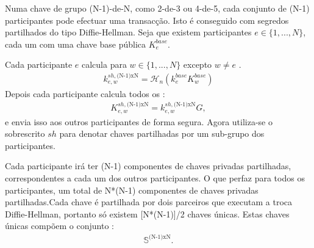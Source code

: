 Numa chave de grupo (N-1)-de-N, como 2-de-3 ou 4-de-5, cada conjunto de (N-1) participantes pode efectuar uma transacção. Isto é conseguido com segredos partilhados do tipo Diffie-Hellman. Seja que existem participantes $e \in \{1,...,N\}$, cada um com uma chave base pública $K^{base}_e$. 


Cada participante $e$ calcula para $w \in \{1,...,N\}$ excepto $w \neq e$ .
\begin{align*}
k^{sh,\textrm{(N-1)xN}}_{e,w} = \mathcal{H}_n(k^{base}_e K^{base}_w)
\end{align*}
Depois cada participante calcula todos os :
\begin{align*}
K^{sh,\textrm{(N-1)xN}}_{e,w} = k^{sh,\textrm{(N-1)xN}}_{e,w} G ,
\end{align*}
e envia isso aos outros participantes de forma segura. Agora utiliza-se o sobrescrito $sh$ para denotar chaves partilhadas por um sub-grupo dos participantes.


Cada participante irá ter (N-1) componentes de chaves privadas partilhadas, correspondentes a cada um dos outros participantes. O que perfaz para todos os participantes, um total de N*(N-1) componentes de chaves privadas partilhadas.\newline Cada chave é partilhada por dois parceiros que executam a troca Diffie-Hellman, portanto só existem [N*(N-1)]/2 chaves únicas. Estas chaves únicas compõem o conjunto :
\begin{align*}
\mathbb{S}^{\textrm{(N-1)xN}} .
\end{align*}


